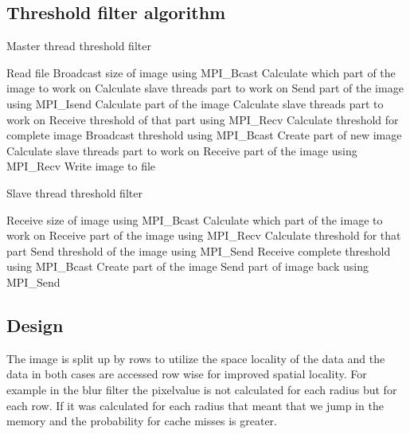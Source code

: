 \documentclass[10pt,twocolumn]{article}
\begin{document}
\subsection{Threshold filter algorithm}

\begin{algorithm}[H]
\caption{Master thread threshold filter}
\label{alg:Master}
\begin{algorithmic}
\State Read file
\State Broadcast size of image using MPI\_Bcast
\State Calculate which part of the image to work on
\State Calculate slave threads part to work on
\State Send part of the image using MPI\_Isend
\EndFor
\State Calculate part of the image
\State Calculate slave threads part to work on
\State Receive threshold of that part using MPI\_Recv
\EndFor
\State Calculate threshold for complete image
\State Broadcast threshold using MPI\_Bcast
\State Create part of new image 
\State Calculate slave threads part to work on
\State Receive part of the image using MPI\_Recv
\EndFor
\State Write image to file
\EndProcedure
\end{algorithmic}
\end{algorithm}

\begin{algorithm}[H]
\caption{Slave thread threshold filter}
\label{alg:Slave}
\begin{algorithmic}
\State Receive size of image using MPI\_Bcast
\State Calculate which part of the image to work on
\State Receive part of the image using MPI\_Recv
\State Calculate threshold for that part
\State Send threshold of the image using MPI\_Send
\State Receive complete threshold using MPI\_Bcast
\State Create part of the image
\State Send part of image back using MPI\_Send
\EndProcedure
\end{algorithmic}
\end{algorithm}

\subsection{Design}
The image is split up by rows to utilize the space locality of the data and the data in both cases are accessed row wise for improved spatial locality. For example in the blur filter the pixelvalue is not calculated for each radius but for each row. If it was calculated for each radius that meant that we jump in the memory and the probability for cache misses is greater.
\end{document}
